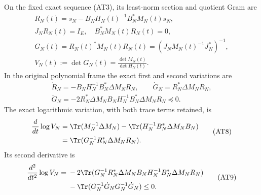 \begin{theorem}
On the fixed exact sequence (AT3), its least-norm section and quotient
Gram are
\[
 \begin{gathered}
 R_N(t)=s_N-B_NH_N(t)^{-1}B_N^*M_N(t)s_N,\\
 J_NR_N(t)=I_E,\quad B_N^*M_N(t)R_N(t)=0,\\
 G_N(t)=R_N(t)^*M_N(t)R_N(t)
       =(J_NM_N(t)^{-1}J_N^*)^{-1},\\
 V_N(t):=\det G_N(t)=\frac{\det M_N(t)}{\det H_N(t)}.
                                                        \end{gathered}
 \tag{AT6}
\]
In the original polynomial frame the exact first and second variations
are
\[
 \begin{gathered}
 \dot R_N=-B_NH_N^{-1}B_N^*\Delta M_NR_N,\qquad
 \dot G_N=R_N^*\Delta M_NR_N,\\
 \ddot G_N=-2R_N^*\Delta M_NB_NH_N^{-1}B_N^*\Delta M_NR_N
            \preceq0.                                \end{gathered}
 \tag{AT7}
\]
The exact logarithmic variation, with both trace terms retained, is
\[
 \begin{split}
 \frac{d}{dt}\log V_N
 &=\Tr(M_N^{-1}\Delta M_N)
   -\Tr(H_N^{-1}B_N^*\Delta M_NB_N)\\
 &=\Tr(G_N^{-1}R_N^*\Delta M_NR_N).             \end{split}
 \tag{AT8}
\]
Its second derivative is
\[
 \begin{split}
 \frac{d^2}{dt^2}\log V_N
 ={}&-2\Tr(G_N^{-1}R_N^*\Delta M_NB_NH_N^{-1}
                         B_N^*\Delta M_NR_N)\\
    &-\Tr(G_N^{-1}\dot G_NG_N^{-1}\dot G_N)\le0.
                                                        \end{split}
 \tag{AT9}
\]
\end{theorem}

